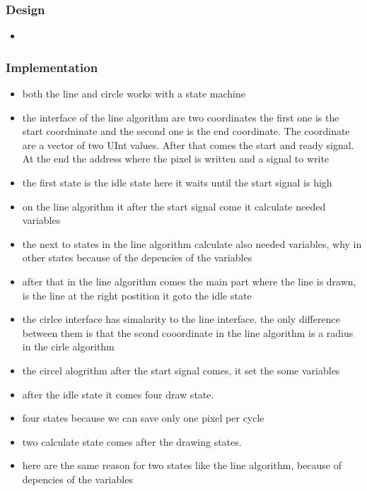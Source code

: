 \subsubsection*{Design}
\begin{itemize}
	\item 
\end{itemize}
\subsubsection*{Implementation}
\begin{itemize}
	\item both the line and circle works with a state machine
	\item the interface of the line algorithm are two coordinates the first one is the start coordninate and the second one is the end coordinate. The coordinate are a vector of two UInt values. After that comes the start and ready signal. At the end the address where the pixel is written and a signal to write
	\item the first state is the idle state here it waits until the start signal is high
	\item on the line algorithm it after the start signal come it calculate needed variables
	\item the next to states in the line algorithm calculate also needed variables, why in other states because of the depencies of the variables
	\item after that in the line algorithm comes the main part where the line is drawn, is the line at the right postition it goto the idle state
	\item the cirlce interface has simalarity to the line interface. the only difference between them is that the scond cooordinate in the line algorithm is a radius in the cirle algorithm
	\item the circel alogrithm after the start signal comes, it set the some variables
	\item after the idle state it comes four draw state.
	\item four states because we can save only one pixel per cycle
	\item two calculate state comes after the drawing states.  
	\item here are the same reason for two states like the line algorithm, because of depencies of the variables
\end{itemize}
